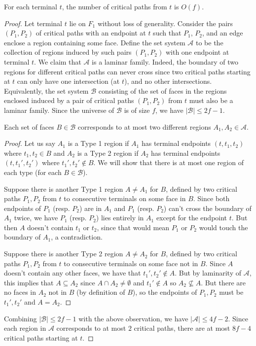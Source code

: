 \documentclass[10pt,a4paper]{amsart}
\begin{document}
\begin{lemma}
\label{lem: critical}
For each terminal $t$, the number of critical paths from $t$ is $O(f)$.
\end{lemma}

\begin{proof}
Let terminal $t$ lie on $F_1$ without loss of generality. Consider the pairs $(P_1,P_2)$ of critical paths with an endpoint at $t$ such that $P_1$, $P_2$, and an edge enclose a region containing some face.
Define the set system $\mathcal{A}$ to be the collection of regions induced by such pairs $(P_1,P_2)$ with one endpoint at terminal $t$. We claim that $\mathcal{A}$ is a laminar family. Indeed, the boundary of two regions for different critical paths can never cross since two critical paths starting at $t$ can only have one intersection (at $t$), and no other intersections.
Equivalently, the set system $\mathcal{B}$ consisting of the set of faces in the regions enclosed induced by a pair of critical paths $(P_1,P_2)$ from $t$ must also be a laminar family. Since the universe of $\mathcal{B}$ is of size $f$, we have $|\mathcal{B}|\le 2f-1$. 
\begin{observation}
    Each set of faces $B\in\mathcal{B}$ corresponds to at most two different regions $A_1,A_2\in\mathcal{A}$.    
\end{observation}
\begin{proof}
    Let us say $A_1$ is a Type 1 region if $A_1$ has terminal endpoints $(t,t_1,t_2)$ where $t_1,t_2\in B$ and $A_2$ is a Type 2 region if $A_2$ has terminal endpoints $(t,t_1',t_2')$ where $t_1',t_2'\not\in B$. We will show that there is at most one region of each type (for each $B\in\mathcal{B}$).
    
    Suppose there is another Type 1 region $A\neq A_1$ for $B$, defined by two critical paths $P_1,P_2$ from $t$ to consecutive terminals on some face in $B$. Since both endpoints of $P_1$ (resp. $P_2$) are in $A_1$ and $P_1$ (resp. $P_2$) can't cross the boundary of $A_1$ twice, we have $P_1$ (resp. $P_2$) lies entirely in $A_1$ except for the endpoint $t$. But then $A$ doesn't contain $t_1$ or $t_2$, since that would mean $P_1$ or $P_2$ would touch the boundary of $A_1$, a contradiction. 
    
    Suppose there is another Type 2 region $A\neq A_2$ for $B$, defined by two critical paths $P_1,P_2$ from $t$ to consecutive terminals on some face not in $B$. Since $A$ doesn't contain any other faces, we have that $t_1',t_2'\not\in A$. But by laminarity of $\mathcal{A}$, this implies that $A\subseteq A_2$ since $A\cap A_2\neq\emptyset$ and $t_1'\not\in A$ so $A_2\not\subseteq A$. But there are no faces in $A_2$ not in $B$ (by definition of $B$), so the endpoints of $P_1,P_2$ must be $t_1',t_2'$ and $A=A_2$.
\end{proof}
Combining $|\mathcal{B}|\le 2f-1$ with the above observation, we have $|\mathcal{A}|\le 4f-2$. Since each region in $\mathcal{A}$ corresponds to at most $2$ critical paths, there are at most $8f-4$ critical paths starting at $t$.
\end{proof}
\end{document}
